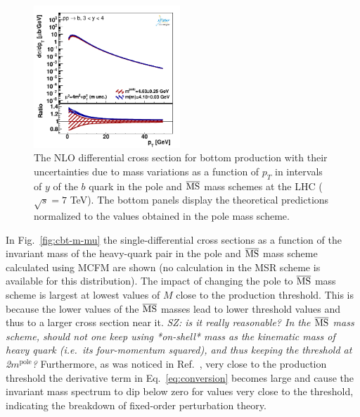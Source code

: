 \documentclass[12pt,a4paper]{article}
\newcommand{\msbar}{\ensuremath{\overline{\rm MS}}\xspace}
\newcommand{\polem}[1][]{\ensuremath{m_{#1}^{\text{pole}}}\xspace}
\begin{document}
\begin{figure}
    \includegraphics[width=0.49\textwidth]{figs/parton-b/dyn-therr-mass/data_401-4.pdf}
    \caption{The NLO differential cross section for bottom production with their uncertainties due to mass variations as a function of $p_T$ in intervals of $y$ of the $b$ quark in the pole and \msbar mass schemes at the LHC ($\sqrt{s} = 7$ TeV). The bottom panels display the theoretical predictions normalized to the values obtained in the pole mass scheme.}
    \label{fig:b-pty-mass}
\end{figure}

In Fig.~\ref{fig:cbt-m-mu} the single-differential cross sections as a function of the invariant mass of the heavy-quark pair in the pole and \msbar mass scheme calculated using MCFM are shown (no calculation in the MSR scheme is available for this distribution). The impact of changing the pole to \msbar mass scheme is largest at lowest values of $M$ close to the production threshold. This is because the lower values of the \msbar masses lead to lower threshold values and thus to a larger cross section near it. {\color{blue}\it SZ: is it really reasonable? In the \msbar mass scheme, should not one keep using *on-shell* mass as the kinematic mass of heavy quark (i.e.\ its four-momentum squared), and thus keeping the threshold at 2\polem?} Furthermore, as was noticed in Ref.~\cite{Dowling:2013baa}, very close to the production threshold the derivative term in Eq.~\ref{eq:conversion} becomes large and cause the invariant mass spectrum to dip below zero for values very close to the threshold, indicating the breakdown of fixed-order perturbation theory.
\end{document}
